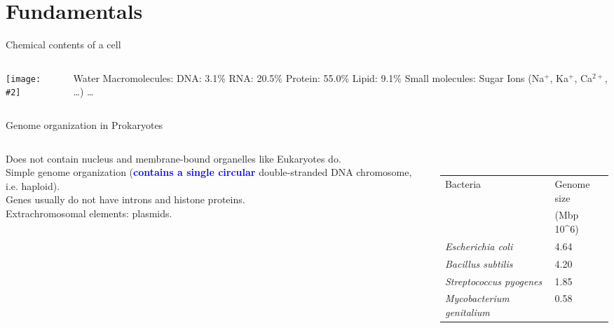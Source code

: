 \documentclass{beamer}
\renewcommand{\c}[1]{\begin{center}#1\end{center}}
\newcommand{\blu}[1]{\textcolor{blue}{\textbf{#1}}}
\newcommand{\gr}[2][.95]{\c{\texttt{[image: \#2]}}}
\begin{document}
\section{Fundamentals}

\begin{frame}{Chemical contents of a cell}
\begin{columns}
    \begin{column}{0.4\textwidth}
        \gr{l1_figs/s7_cell.png}
    \end{column}
    \begin{column}{0.6\textwidth}
        \begin{outline}
            \1[] Water
            \1[] Macromolecules:
                \2 DNA: 3.1\%
                \2 RNA: 20.5\%
                \2 Protein: 55.0\%
                \2 Lipid: 9.1\%
            \1[] Small molecules:
                \2 Sugar
                \2 Ions (Na$^+$, Ka$^+$, Ca$^{2+}$, \ldots)
                \2 \ldots
        \end{outline}
    \end{column}
\end{columns}
\end{frame}

\begin{frame}{Genome organization in Prokaryotes}
\begin{columns}
\begin{column}{0.6\textwidth}
    Does not contain nucleus and membrane-bound organelles like Eukaryotes do.\\
    \bigskip
    Simple genome organization (\blu{contains a single circular} double-stranded DNA chromosome, i.e. haploid).\\
    \bigskip
    Genes usually do not have introns and histone proteins.\\
    \bigskip
    Extrachromosomal elements: plasmids.
\end{column}
\begin{column}{0.4\textwidth}
\c{
    \fbox{\gr{l1_figs/s8_prok.png}}\\
    \bigskip
    \tiny
    \begin{tabular}{|l|l|}
        \hline
        Bacteria & Genome size\\
        & (Mbp 10^6)\\
        \hline
        \textit{Escherichia coli} & 4.64\\
        \textit{Bacillus subtilis} & 4.20\\
        \textit{Streptococcus pyogenes} & 1.85\\
        \textit{Mycobacterium genitalium} & 0.58\\
        \hline
    \end{tabular}
}
\end{column}\end{columns}
\end{frame}
\end{document}
